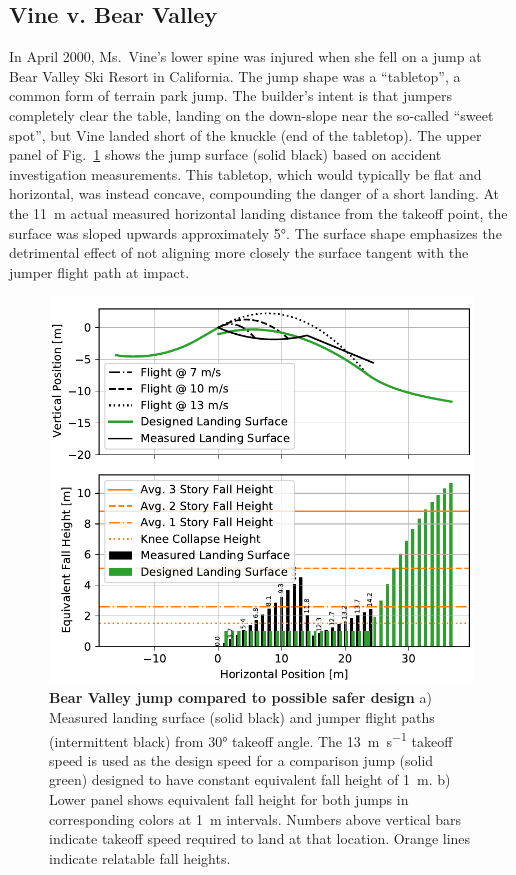 \documentclass{article}
\begin{document}
\subsection{Vine v. Bear Valley}
%
In April 2000, Ms.~Vine's lower spine was injured when she fell on a
jump at Bear Valley Ski Resort in California. The jump
shape was a ``tabletop'', a common form of terrain park jump.
The builder's intent is that jumpers completely clear the table, landing
on the down-slope near the so-called ``sweet spot'', but Vine landed short of the knuckle 
(end of the tabletop). The upper panel of
Fig.~\ref{fig:vine-v-bear-valley} shows the jump surface (solid black) based on  
 accident investigation measurements. This 
tabletop, which would typically be flat and horizontal, was instead concave, 
compounding the danger of a short landing.  At the
11~\si{\meter} actual measured horizontal landing distance from the takeoff point, the surface
was sloped upwards approximately 5\si{\degree}.  The surface shape emphasizes the detrimental
effect of not aligning more closely the surface tangent with the jumper flight path at
impact.
%
\begin{figure}
  \centering
  \includegraphics[width=5.25in]{figures/vine-v-bear-valley.pdf}
  \caption{\textbf{Bear Valley jump compared to possible safer design}
  a) Measured landing surface (solid black) and jumper flight paths (intermittent
  black) from 30\si{\degree} takeoff angle. The
  13~\si{\meter\per\second} takeoff speed is used as the design speed for a comparison 
  jump (solid green) designed to have constant equivalent fall height of 1~\si{\meter}. 
  b) Lower panel shows equivalent fall height for both jumps
  in corresponding colors at 1~\si{\meter} intervals. Numbers above 
  vertical bars indicate takeoff speed required
  to land at that location. Orange lines indicate relatable fall heights.}
  \label{fig:vine-v-bear-valley}
\end{figure}
\end{document}

